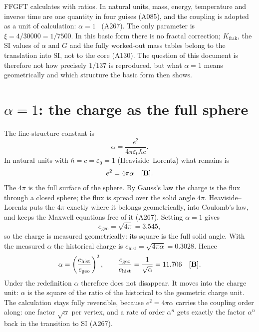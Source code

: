 FFGFT calculates with ratios. In natural units, mass, energy, temperature and inverse time are
one quantity in four guises (A085), and the coupling is adopted as a unit of calculation:
$\alpha=1$ \QM\ (A267). The only parameter is $\xi=4/30000=1/7500$. In this basic form there is no
fractal correction; $K_{\text{frak}}$, the SI values of $\alpha$ and $G$ and the fully worked-out
mass tables belong to the translation into SI, not to the core (A130). The question of this
document is therefore not how precisely $1/137$ is reproduced, but what $\alpha=1$ means
geometrically and which structure the basic form then shows.

\section{\texorpdfstring{$\alpha=1$}{alpha = 1}: the charge as the full sphere}

The fine-structure constant is
\begin{equation}
  \alpha=\frac{e^2}{4\pi\varepsilon_0\hbar c}.
\end{equation}
In natural units with $\hbar=c=\varepsilon_0=1$ (Heaviside--Lorentz) what remains is
\begin{equation}
  e^2=4\pi\alpha \quad\textbf{[B]} .
\end{equation}
The $4\pi$ is the full surface of the sphere. By Gauss's law the charge is the flux through a
closed sphere; the flux is spread over the solid angle $4\pi$. Heaviside--Lorentz puts the $4\pi$
exactly where it belongs geometrically, into Coulomb's law, and keeps the Maxwell equations free
of it (A267). Setting $\alpha=1$ gives
\begin{equation}
  e_{\text{geo}}=\sqrt{4\pi}=3.545 ,
\end{equation}
so the charge is measured geometrically: its square is the full solid angle. With the measured
$\alpha$ the historical charge is $e_{\text{hist}}=\sqrt{4\pi\alpha}=0.3028$. Hence
\begin{equation}
  \alpha=\left(\frac{e_{\text{hist}}}{e_{\text{geo}}}\right)^2,\qquad
  \frac{e_{\text{geo}}}{e_{\text{hist}}}=\frac1{\sqrt\alpha}=11.706\quad\textbf{[B]} .
\end{equation}
Under the redefinition $\alpha$ therefore does not disappear. It moves into the charge unit:
$\alpha$ is the square of the ratio of the historical to the geometric charge unit. The
calculation stays fully reversible, because $e^2=4\pi\alpha$ carries the coupling order along:
one factor $\sqrt\alpha$ per vertex, and a rate of order $\alpha^n$ gets exactly the factor
$\alpha^n$ back in the transition to SI (A267).

